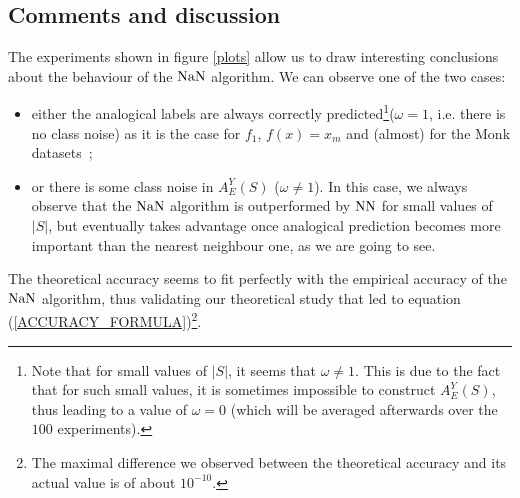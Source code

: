 \subsection{Comments and discussion}

The experiments shown in figure \ref{plots} allow us to draw interesting
conclusions about the behaviour of the $\mbox{NaN}$ algorithm.  We can observe one of
the two cases:
\begin{itemize}
  \item either the analogical labels are always correctly
    predicted\footnote{Note that for small values of $|S|$, it seems that
      $\omega \neq 1$. This is due to the fact that for such small values, it
      is sometimes impossible to construct $A_E^Y(S)$, thus leading to a value
      of $\omega = 0$ (which will be averaged afterwards over the $100$
    experiments).}($\omega = 1$, i.e. there is no class noise) as it is the case for  $f_1$, $f(x) = x_m$ and
    (almost) for the Monk datasets~;
    \item or there is some class noise in $A_E^Y(S)$ ($\omega \neq 1$). In this
      case, we always observe that the $\mbox{NaN}$ algorithm is outperformed by
      $\mbox{NN}$ for small values of $|S|$, but eventually takes advantage once
      analogical prediction becomes more important than the nearest neighbour
      one, as we are going to see.
\end{itemize}

The theoretical accuracy seems to fit perfectly with the empirical accuracy of
the $\mbox{NaN}$ algorithm, thus validating our theoretical study that led to
equation (\ref{ACCURACY_FORMULA})\footnote{The maximal difference we observed between the
theoretical accuracy and its actual value is of about $10^{-10}$.}.

